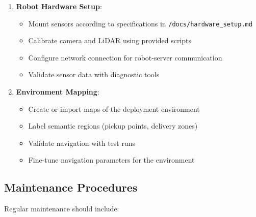 \documentclass[12pt]{article}
\begin{document}
\begin{enumerate}
    \item \textbf{Robot Hardware Setup}:
    \begin{itemize}
        \item Mount sensors according to specifications in \texttt{/docs/hardware\_setup.md}
        \item Calibrate camera and LiDAR using provided scripts
        \item Configure network connection for robot-server communication
        \item Validate sensor data with diagnostic tools
    \end{itemize}
    
    \item \textbf{Environment Mapping}:
    \begin{itemize}
        \item Create or import maps of the deployment environment
        \item Label semantic regions (pickup points, delivery zones)
        \item Validate navigation with test runs
        \item Fine-tune navigation parameters for the environment
    \end{itemize}
\end{enumerate}

\subsection{Maintenance Procedures}

Regular maintenance should include:
\end{document}
